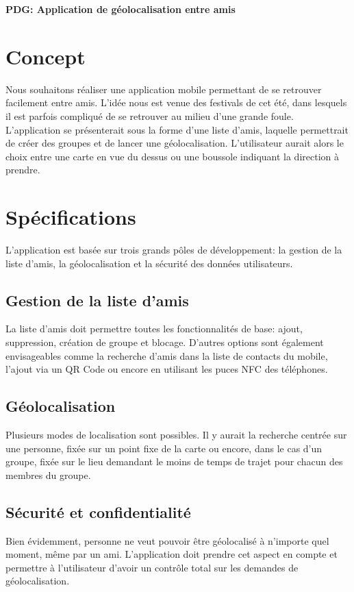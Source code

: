\documentclass[french]{article}
\begin{document}
	\centering
	\large{\textbf{PDG: Application de géolocalisation entre amis}}
	
	\justify
	
	\section{Concept}
		Nous souhaitons réaliser une application mobile permettant de se retrouver facilement entre amis. L'idée nous est venue des festivals de cet été, dans lesquels il est parfois compliqué de se retrouver au milieu d'une grande foule. L'application se présenterait sous la forme d'une liste d'amis, laquelle permettrait de créer des groupes et de lancer une géolocalisation. L'utilisateur aurait alors le choix entre une carte en vue du dessus ou une boussole indiquant la direction à prendre. 
	
	\section{Spécifications}
		L'application est basée sur trois grands pôles de développement: la gestion de la liste d'amis, la géolocalisation et la sécurité des données utilisateurs.
	
		\subsection{Gestion de la liste d'amis}
			La liste d'amis doit permettre toutes les fonctionnalités de base: ajout, suppression, création de groupe et blocage. D'autres options sont également envisageables comme la recherche d'amis dans la liste de contacts du mobile, l'ajout via un QR Code ou encore en utilisant les puces NFC des téléphones.
			
		\subsection{Géolocalisation}
			Plusieurs modes de localisation sont possibles. Il y aurait la recherche centrée sur une personne, fixée sur un point fixe de la carte ou encore, dans le cas d'un groupe, fixée sur le lieu demandant le moins de temps de trajet pour chacun des membres du groupe.
	
		\subsection{Sécurité et confidentialité}
			Bien évidemment, personne ne veut pouvoir être géolocalisé à n'importe quel moment, même par un ami. L'application doit prendre cet aspect en compte et permettre à l'utilisateur d'avoir un contrôle total sur les demandes de géolocalisation.\\
			
\end{document}
